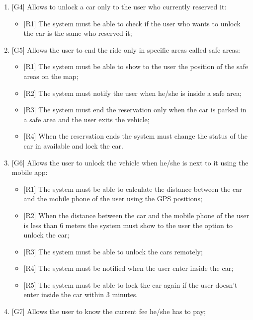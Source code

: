 \begin{enumerate}
\item {[G4]} Allows to unlock a car only to the user who currently reserved it:

\begin{itemize}
	\item {[R1]} The system must be able to check if the user who wants to unlock the car is the same who reserved it;
\end{itemize}

\item {[G5]} Allows the user to end the ride only in specific areas called safe areas:

\begin{itemize}
	\item {[R1]} The system must be able to show to the user the position of the safe areas on the map;
	\item {[R2]} The system must notify the user when he/she is inside a safe area;
	\item {[R3]} The system must end the reservation only when the car is parked in a safe area and the user exits the vehicle;
	\item {[R4]} When the reservation ends the system must change the status of the car in available and lock the car.
\end{itemize}

\item {[G6]} Allows the user to unlock the vehicle when he/she is next to it using the mobile app:

\begin{itemize}
	\item {[R1]} The system must be able to calculate the distance between the car and the mobile phone of the user using the GPS positions;
	\item {[R2]} When the distance between the car and the mobile phone of the user is less than 6 meters the system must show to the user the option to unlock the car;
	\item {[R3]} The system must be able to unlock the cars remotely;
	\item {[R4]} The system must be notified when the user enter inside the car;
	\item {[R5]} The system must be able to lock the car again if the user doesn't enter inside the car within 3 minutes.
\end{itemize}

\item {[G7]} Allows the user to know the current fee he/she has to pay;


\end{enumerate}
